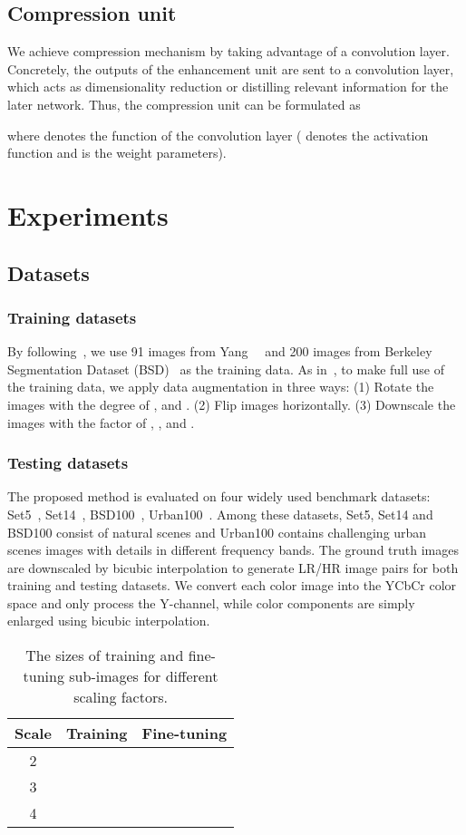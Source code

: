 \documentclass[10pt,twocolumn,letterpaper]{article}
\begin{document}
\subsection{Compression unit}
We achieve compression mechanism by taking advantage of a  convolution layer. Concretely, the outputs of the enhancement unit are sent to a  convolution layer, which acts as dimensionality reduction or distilling relevant information for the later network. Thus, the compression unit can be formulated as

where  denotes the function of the  convolution layer ( denotes the activation function and  is the weight parameters).

\section{Experiments}
\subsection{Datasets}
\subsubsection{Training datasets}
By following~\cite{VDSR,LapSRN,DRRN,MemNet}, we use 91 images from Yang~\etal~\cite{sparse_coding_TIP} and 200 images from Berkeley Segmentation Dataset (BSD)~\cite{BSD} as the training data. As in~\cite{DRRN}, to make full use of the training data, we apply data augmentation in three ways: (1) Rotate the images with the degree of ,  and . (2) Flip images horizontally. (3) Downscale the images with the factor of , ,  and .

\subsubsection{Testing datasets}
The proposed method is evaluated on four widely used benchmark datasets: Set5~\cite{Set5}, Set14~\cite{Set14}, BSD100~\cite{BSD}, Urban100~\cite{Urban100}. Among these datasets, Set5, Set14 and BSD100 consist of natural scenes and Urban100 contains challenging urban scenes images with details in different frequency bands. The ground truth images are downscaled by bicubic interpolation to generate LR/HR image pairs for both training and testing datasets. We convert each color image into the YCbCr color space and only process the Y-channel, while color components are simply enlarged using bicubic interpolation.
\begin{table}[htb]
	\small
	\centering
	\begin{tabular}{|c|c|c|}
		\hline
		Scale & Training & Fine-tuning \\
		\hline\hline
		2 &  &  \\
		3 &  &  \\
		4 &  &  \\
		\hline
	\end{tabular}
	\caption{The sizes of training and fine-tuning sub-images for different scaling factors.}
	\label{samples_setting}
\end{table}
\end{document}
